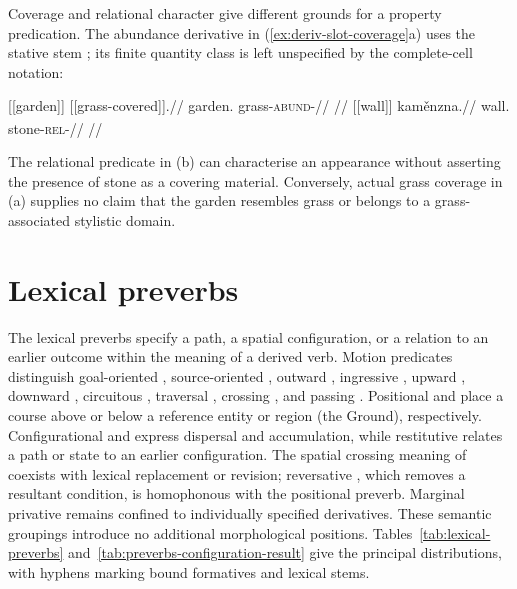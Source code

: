 Coverage and relational character give different grounds for a property
predication. The abundance derivative in (\ref{ex:deriv-slot-coverage}a)
uses the stative stem ; its finite quantity class is left
unspecified by the complete-cell notation:

\pex\label{ex:deriv-slot-coverage}
\a
\begingl
\gla \textnormal{[[garden]]}\textsubscript{\Dir{}} \textnormal{[[grass-covered]]}\textsubscript{\Cont{}}.//
\glb garden.\Dir{} grass-\textsc{abund}-\Cont{}//
\glft {}
//
\endgl
\a
\begingl
\gla \textnormal{[[wall]]}\textsubscript{\Dir{}} kaměnzna.//
\glb wall.\Dir{} stone-\textsc{rel}-\Cont{}//
\glft {}
//
\endgl
\xe

The relational predicate in (b) can characterise an appearance without
asserting the presence of stone as a covering material. Conversely, actual
grass coverage in (a) supplies no claim that the garden resembles grass
or belongs to a grass-associated stylistic domain.

\section{Lexical preverbs}\label{sec:lexical-preverbs}

The lexical preverbs specify a path, a spatial configuration, or a relation
to an earlier outcome within the meaning of a derived verb. Motion predicates
distinguish goal-oriented , source-oriented , outward
, ingressive , upward , downward ,
circuitous , traversal , crossing , and
passing . Positional  and  place a course
above or below a reference entity or region (the Ground), respectively.
Configurational 
and  express dispersal and accumulation, while restitutive
 relates a path or state to an earlier configuration. The spatial
crossing meaning of  coexists with lexical replacement or
revision; reversative , which removes a resultant condition,
is homophonous with the positional preverb. Marginal privative 
remains confined to individually specified derivatives. These semantic
groupings introduce no additional morphological positions.
Tables~\ref{tab:lexical-preverbs} and~\ref{tab:preverbs-configuration-result}
give the principal distributions, with hyphens marking bound formatives and
lexical stems.


